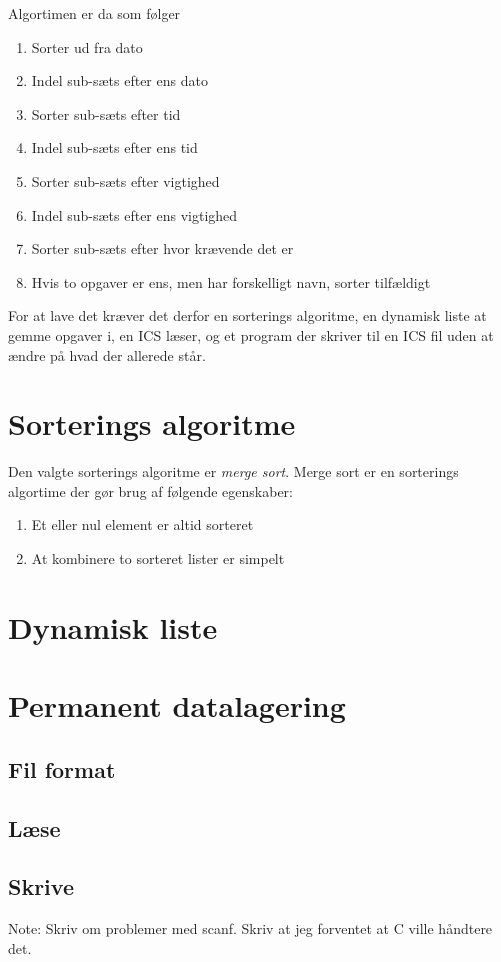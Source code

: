 \documentclass{article}
\begin{document}
\newpage
Algortimen er da som f{\o}lger
\begin{enumerate}
	\item Sorter ud fra dato
	\item Indel sub-s{\ae}ts efter ens dato
	\item Sorter sub-s{\ae}ts efter tid
	\item Indel sub-s{\ae}ts efter ens tid
	\item Sorter sub-s{\ae}ts efter vigtighed
	\item Indel sub-s{\ae}ts efter ens vigtighed
	\item Sorter sub-s{\ae}ts efter hvor kr{\ae}vende det er
	\item Hvis to opgaver er ens, men har forskelligt navn, sorter
		tilf{\ae}ldigt
\end{enumerate}
For at lave det kr{\ae}ver det derfor en sorterings algoritme, en dynamisk liste
at gemme opgaver i, en ICS l{\ae}ser, og et program der skriver til en ICS fil
uden at {\ae}ndre p{\aa} hvad der allerede st{\aa}r.
\section{Sorterings algoritme}
Den valgte sorterings algoritme er \textit{merge sort}. Merge sort er en
sorterings algortime der g{\o}r brug af f{\o}lgende egenskaber:
\begin{enumerate}
	\item Et eller nul element er altid sorteret
	\item At kombinere to sorteret lister er simpelt
\end{enumerate}
\section{Dynamisk liste}
\section{Permanent datalagering}
\subsection{Fil format}
\subsection{L{\ae}se}
\subsection{Skrive}
Note: Skriv om problemer med scanf. Skriv at jeg forventet at C ville
h{\aa}ndtere det.
\end{document}
